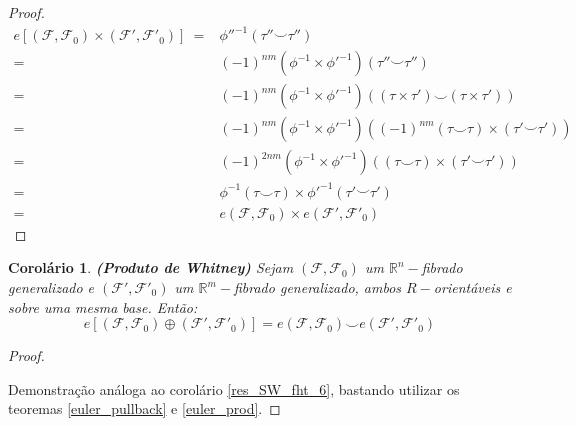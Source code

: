 \documentclass[12pt,oneside]{book} %
\newtheorem{cor}    {\hspace{0.5cm}Corol\'ario}[chapter]
\newcommand{\R}{\mathbb{R}}
\newcommand{\ccup}{\smile}
\begin{document}
\begin{proof}
	$\begin{array}{rl}
		e\left[ (\mathcal{F},\mathcal{F}_{0})\times (\mathcal{F'},\mathcal{F'}_{0}) \right] \ = & \phi''^{-1}(\tau''\ccup\tau'') \\
		= & (-1)^{nm}(\phi^{-1}\times\phi'^{-1})\left( \tau''\ccup\tau'' \right) \\
		= & (-1)^{nm}(\phi^{-1}\times\phi'^{-1})\left( (\tau\times\tau')\ccup (\tau\times\tau') \right) \\
		= & (-1)^{nm}(\phi^{-1}\times\phi'^{-1})\left( (-1)^{nm}(\tau\ccup\tau)\times (\tau'\ccup\tau') \right) \\
		= & (-1)^{2nm}(\phi^{-1}\times\phi'^{-1})\left( (\tau\ccup\tau)\times (\tau'\ccup\tau') \right) \\
		= & \phi^{-1}(\tau\ccup\tau)\times\phi'^{-1}(\tau'\ccup\tau') \\
		= & e(\mathcal{F},\mathcal{F}_{0})\times e(\mathcal{F'},\mathcal{F'}_{0})
	\end{array}$ \newline
	
\end{proof}

\begin{cor}{\bf (Produto de Whitney)}
	Sejam $(\mathcal{F},\mathcal{F}_{0})$ um $\R^{n}-$fibrado generalizado e $(\mathcal{F'},\mathcal{F'}_{0})$ um $\R^{m}-$fibrado generalizado, ambos $R-$orientáveis e sobre uma mesma base. Então:
	$$ e[(\mathcal{F},\mathcal{F}_{0})\oplus (\mathcal{F'},\mathcal{F'}_{0})]=e(\mathcal{F},\mathcal{F}_{0})\ccup e(\mathcal{F'},\mathcal{F'}_{0}) $$
\end{cor}
\begin{proof}
	
	\
	
	\par Demonstração análoga ao corolário \ref{res_SW_fht_6}, bastando utilizar os teoremas \ref{euler_pullback} e \ref{euler_prod}.
	
\end{proof}
\end{document}
